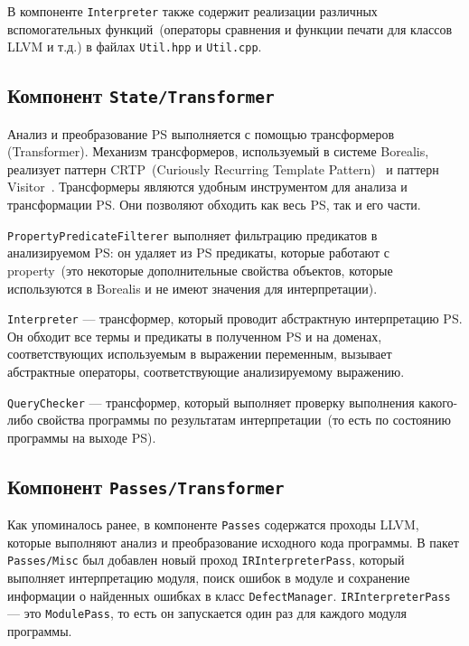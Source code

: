 В компоненте \texttt{Interpreter} также содержит реализации различных 
вспомогательных функций~(операторы сравнения и функции печати для классов LLVM
и т.д.) в файлах \texttt{Util.hpp} и \texttt{Util.cpp}.

\subsection{Компонент \texttt{State/Transformer}}
Анализ и преобразование PS выполняется с помощью трансфор­меров (Transformer). 
Механизм трансформеров, используемый в си­стеме Borealis, реализует паттерн 
CRTP~(Curiously Recurring Template Pattern)~\cite{crtp} и паттерн 
Visitor~\cite{visitor}. Трансформеры являются удобным инструментом для анализа 
и трансформации PS. Они позволяют об­ходить как весь PS, так и его части.

\texttt{PropertyPredicateFilterer} выполняет фильтрацию предикатов в 
анализируемом PS: он удаляет из PS предикаты, которые работают с property~(это
некоторые дополнительные свойства объектов, которые используются в Borealis и
не имеют значения для интерпретации).

\texttt{Interpreter} --- трансформер, который проводит абстрактную интерпретацию
PS. Он обходит все термы и предикаты в полученном PS и на доменах,
соответствующих используемым в выражении переменным, вызывает абстрактные 
операторы, соответствующие анализируемому выражению.

\texttt{QueryChecker} --- трансформер, который выполняет проверку выполнения
какого-либо свойства программы по результатам интерпретации~(то есть по 
состоянию программы на выходе PS).

\subsection{Компонент \texttt{Passes/Transformer}}
Как упоминалось ранее, в компоненте \texttt{Passes} содержатся проходы LLVM,
которые выполняют анализ и преобразование исходного кода программы. В пакет \texttt{Passes/Misc} был добавлен новый проход
\texttt{IRInterpreterPass}, который выполняет интерпретацию модуля, поиск 
ошибок в модуле и сохранение информации о найденных ошибках в класс 
\texttt{DefectManager}. \texttt{IRInterpreterPass} --- это \texttt{ModulePass}, то есть он запускается один раз для каждого модуля программы.

